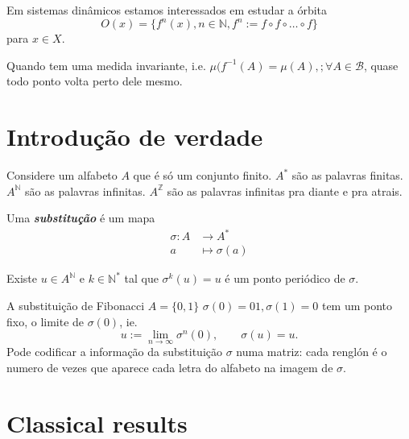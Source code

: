 Em sistemas dinâmicos estamos interessados em estudar a órbita
\[O(x)=\{f^n(x), n \in \mathbb{N}, f^n:=f \circ f \circ\ldots \circ f\}\]
para $x \in X$.

Quando tem uma medida invariante, i.e. $\mu(f^{-1}(A)=\mu(A),; \forall A \in \mathcal{B}$,  quase todo ponto volta perto dele mesmo.

\section{Introdução de verdade}

Considere um alfabeto $A$ que é só um conjunto finito. $A^*$ são as palavras finitas. $A^\mathbb{N}$ são as palavras infinitas. $A^\mathbb{Z}$ são as palavras infinitas pra diante e pra atrais.

Uma \textit{\textbf{substitução}} é um mapa
\begin{align*}
	\sigma: A &\longrightarrow A^* \\
	a &\longmapsto \sigma(a)
\end{align*}

\begin{lemma}\leavevmode
	Existe $u \in A^\mathbb{N}$ e $k \in \mathbb{N}^*$ tal que $\sigma^k(u)=u$ é um ponto periódico de $\sigma$.
\end{lemma}

\begin{remark}\leavevmode
	A substituição de Fibonacci $A=\{0,1\}$ $\sigma(0)=01, \sigma(1)=0$ tem um ponto fixo, o limite de $\sigma(0)$, ie.
	\[u:=\lim_{n \to \infty} \sigma^n(0),\qquad \sigma(u)=u.\]
	Pode codificar a informação da substituição $\sigma$ numa matriz: cada renglón é o numero de vezes que aparece cada letra do alfabeto na imagem de $\sigma$.
\end{remark}

\section{Classical results}

